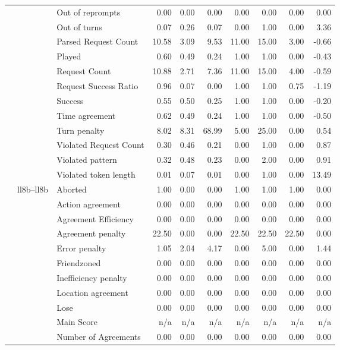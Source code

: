 \begin{tabular}{lllrrrrrrr}
 &  & Out of reprompts & 0.00 & 0.00 & 0.00 & 0.00 & 0.00 & 0.00 & 0.00 \\
 &  & Out of turns & 0.07 & 0.26 & 0.07 & 0.00 & 1.00 & 0.00 & 3.36 \\
 &  & Parsed Request Count & 10.58 & 3.09 & 9.53 & 11.00 & 15.00 & 3.00 & -0.66 \\
 &  & Played & 0.60 & 0.49 & 0.24 & 1.00 & 1.00 & 0.00 & -0.43 \\
 &  & Request Count & 10.88 & 2.71 & 7.36 & 11.00 & 15.00 & 4.00 & -0.59 \\
 &  & Request Success Ratio & 0.96 & 0.07 & 0.00 & 1.00 & 1.00 & 0.75 & -1.19 \\
 &  & Success & 0.55 & 0.50 & 0.25 & 1.00 & 1.00 & 0.00 & -0.20 \\
 &  & Time agreement & 0.62 & 0.49 & 0.24 & 1.00 & 1.00 & 0.00 & -0.50 \\
 &  & Turn penalty & 8.02 & 8.31 & 68.99 & 5.00 & 25.00 & 0.00 & 0.54 \\
 &  & Violated Request Count & 0.30 & 0.46 & 0.21 & 0.00 & 1.00 & 0.00 & 0.87 \\
 &  & Violated pattern & 0.32 & 0.48 & 0.23 & 0.00 & 2.00 & 0.00 & 0.91 \\
 &  & Violated token length & 0.01 & 0.07 & 0.01 & 0.00 & 1.00 & 0.00 & 13.49 \\
\cline{2-10}
 & \multirow[t]{27}{*}{ll8b--ll8b} & Aborted & 1.00 & 0.00 & 0.00 & 1.00 & 1.00 & 1.00 & 0.00 \\
 &  & Action agreement & 0.00 & 0.00 & 0.00 & 0.00 & 0.00 & 0.00 & 0.00 \\
 &  & Agreement Efficiency & 0.00 & 0.00 & 0.00 & 0.00 & 0.00 & 0.00 & 0.00 \\
 &  & Agreement penalty & 22.50 & 0.00 & 0.00 & 22.50 & 22.50 & 22.50 & 0.00 \\
 &  & Error penalty & 1.05 & 2.04 & 4.17 & 0.00 & 5.00 & 0.00 & 1.44 \\
 &  & Friendzoned & 0.00 & 0.00 & 0.00 & 0.00 & 0.00 & 0.00 & 0.00 \\
 &  & Inefficiency penalty & 0.00 & 0.00 & 0.00 & 0.00 & 0.00 & 0.00 & 0.00 \\
 &  & Location agreement & 0.00 & 0.00 & 0.00 & 0.00 & 0.00 & 0.00 & 0.00 \\
 &  & Lose & 0.00 & 0.00 & 0.00 & 0.00 & 0.00 & 0.00 & 0.00 \\
 &  & Main Score & n/a & n/a & n/a & n/a & n/a & n/a & n/a \\
 &  & Number of Agreements & 0.00 & 0.00 & 0.00 & 0.00 & 0.00 & 0.00 & 0.00 \\

\end{tabular}
